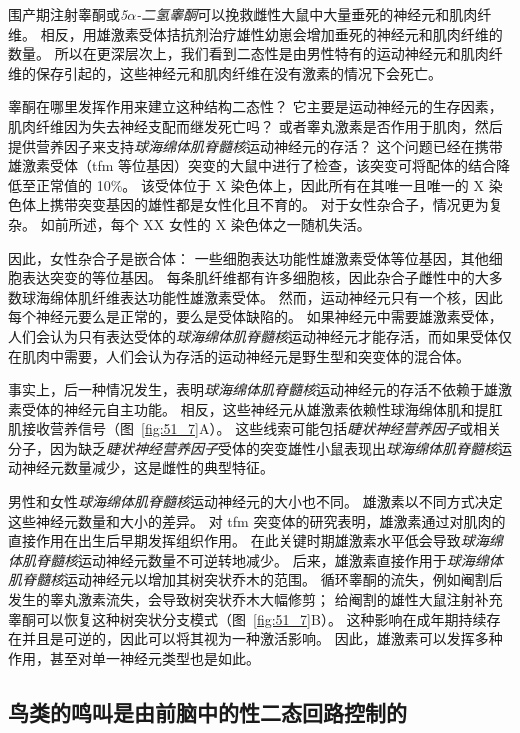 围产期注射睾酮或\textit{5$\alpha$-二氢睾酮}可以挽救雌性大鼠中大量垂死的神经元和肌肉纤维。
相反，用雄激素受体拮抗剂治疗雄性幼崽会增加垂死的神经元和肌肉纤维的数量。
所以在更深层次上，我们看到二态性是由男性特有的运动神经元和肌肉纤维的保存引起的，这些神经元和肌肉纤维在没有激素的情况下会死亡。


睾酮在哪里发挥作用来建立这种结构二态性？
它主要是运动神经元的生存因素，肌肉纤维因为失去神经支配而继发死亡吗？
或者睾丸激素是否作用于肌肉，然后提供营养因子来支持\textit{球海绵体肌脊髓核}运动神经元的存活？
这个问题已经在携带雄激素受体（tfm 等位基因）突变的大鼠中进行了检查，该突变可将配体的结合降低至正常值的 10\%。
该受体位于 X 染色体上，因此所有在其唯一且唯一的 X 染色体上携带突变基因的雄性都是女性化且不育的。
对于女性杂合子，情况更为复杂。
如前所述，每个 XX 女性的 X 染色体之一随机失活。


因此，女性杂合子是嵌合体：
一些细胞表达功能性雄激素受体等位基因，其他细胞表达突变的等位基因。
每条肌纤维都有许多细胞核，因此杂合子雌性中的大多数球海绵体肌纤维表达功能性雄激素受体。
然而，运动神经元只有一个核，因此每个神经元要么是正常的，要么是受体缺陷的。
如果神经元中需要雄激素受体，人们会认为只有表达受体的\textit{球海绵体肌脊髓核}运动神经元才能存活，而如果受体仅在肌肉中需要，人们会认为存活的运动神经元是野生型和突变体的混合体。


事实上，后一种情况发生，表明\textit{球海绵体肌脊髓核}运动神经元的存活不依赖于雄激素受体的神经元自主功能。
相反，这些神经元从雄激素依赖性球海绵体肌和提肛肌接收营养信号（图~\ref{fig:51_7}A）。
这些线索可能包括\textit{睫状神经营养因子}或相关分子，因为缺乏\textit{睫状神经营养因子}受体的突变雄性小鼠表现出\textit{球海绵体肌脊髓核}运动神经元数量减少，这是雌性的典型特征。


男性和女性\textit{球海绵体肌脊髓核}运动神经元的大小也不同。
雄激素以不同方式决定这些神经元数量和大小的差异。
对 tfm 突变体的研究表明，雄激素通过对肌肉的直接作用在出生后早期发挥组织作用。
在此关键时期雄激素水平低会导致\textit{球海绵体肌脊髓核}运动神经元数量不可逆转地减少。
后来，雄激素直接作用于\textit{球海绵体肌脊髓核}运动神经元以增加其树突状乔木的范围。
循环睾酮的流失，例如阉割后发生的睾丸激素流失，会导致树突状乔木大幅修剪；
给阉割的雄性大鼠注射补充睾酮可以恢复这种树突状分支模式（图~\ref{fig:51_7}B）。
这种影响在成年期持续存在并且是可逆的，因此可以将其视为一种激活影响。
因此，雄激素可以发挥多种作用，甚至对单一神经元类型也是如此。



\subsection{鸟类的鸣叫是由前脑中的性二态回路控制的}

